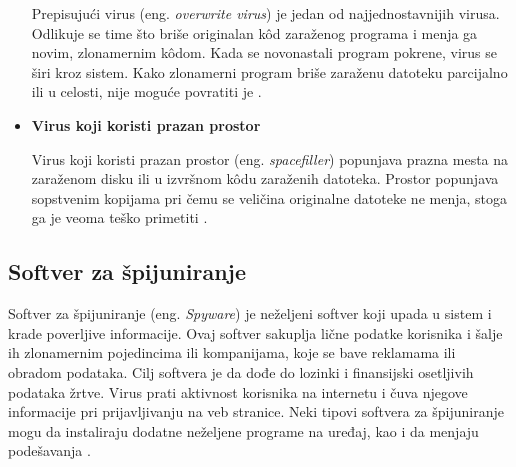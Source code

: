\documentclass[a4paper]{article}
\begin{document}
\begin{itemize}
Prepisujući virus (eng. \textit{overwrite virus}) je jedan od najjednostavnijih virusa. Odlikuje se time što briše originalan kôd zaraženog programa i menja ga novim, zlonamernim kôdom. Kada se novonastali program pokrene, virus se širi kroz sistem. Kako zlonamerni program briše zaraženu datoteku parcijalno ili u celosti, nije moguće povratiti je \cite{overwriting_virus}.

\item \textbf{Virus koji koristi prazan prostor}

Virus koji koristi prazan prostor (eng. \textit{spacefiller}) popunjava prazna mesta na zaraženom disku ili u izvršnom kôdu zaraženih datoteka. Prostor popunjava sopstvenim kopijama pri čemu se veličina originalne datoteke ne menja, stoga ga je veoma teško primetiti \cite{spacefiller_virus}.

\end{itemize}


\subsection{Softver za špijuniranje}
\label{spyware}
Softver za špijuniranje (eng. \textit{Spyware}) je neželjeni softver koji upada u sistem i krade poverljive informacije. Ovaj softver sakuplja lične podatke korisnika i šalje ih zlonamernim pojedincima ili kompanijama, koje se bave reklamama ili obradom podataka. Cilj softvera je da dođe do lozinki i finansijski osetljivih podataka žrtve. Virus prati aktivnost korisnika na internetu i čuva njegove informacije pri prijavljivanju na veb stranice. Neki tipovi softvera za špijuniranje mogu da instaliraju dodatne neželjene programe na uređaj, kao i da menjaju podešavanja \cite{spyware}.
\end{document}
